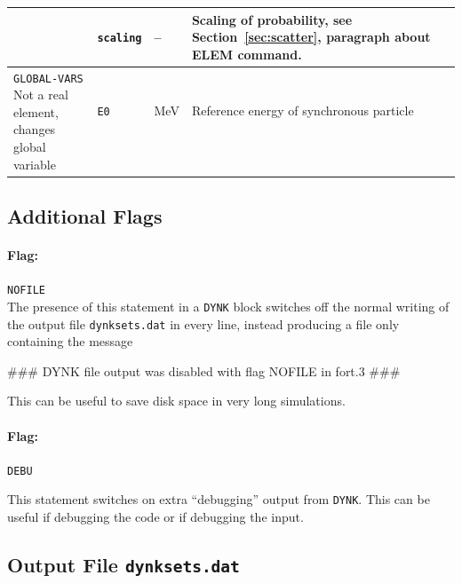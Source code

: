 \begin{table}[ht]
\begin{center}
\begin{tabular}{|l | l | l | p{6cm}|}
    & \texttt{scaling}     & --      & Scaling of probability, see Section~\ref{sec:scatter}, paragraph about ELEM command.\\
  \hline
    \multirow{3}{*}{\parbox{4cm}{\texttt{GLOBAL-VARS} \\ Not a real element,\\ changes global variable}}
    & \texttt{E0}     & MeV      & Reference energy of synchronous particle \\
    &      &       &  \\
  \hline

\end{tabular}
\end{center}
\end{table}

\subsection{Additional Flags}

\paragraph{Flag:} \texttt{NOFILE}\\

The presence of this statement in a \texttt{DYNK} block switches off the normal writing of the output file \texttt{dynksets.dat} in every line, instead producing a file only containing the message
\begin{cverbatim}
### DYNK file output was disabled with flag NOFILE in fort.3 ###
\end{cverbatim}
This can be useful to save disk space in very long simulations.

\paragraph{Flag:} \texttt{DEBU}

This statement switches on extra ``debugging'' output from \texttt{DYNK}.
This can be useful if debugging the code or if debugging the input.

\subsection{Output File \texttt{dynksets.dat}}

